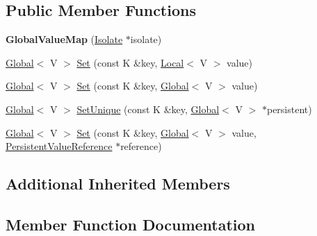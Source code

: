 \subsection*{Public Member Functions}
\begin{DoxyCompactItemize}
\item 
\mbox{\label{classv8_1_1GlobalValueMap_a60018c72fdae03d51b687d2a941140f4}} 
{\bfseries Global\+Value\+Map} (\mbox{\hyperlink{classv8_1_1Isolate}{Isolate}} $\ast$isolate)
\item 
\mbox{\hyperlink{classv8_1_1Global}{Global}}$<$ V $>$ \mbox{\hyperlink{classv8_1_1GlobalValueMap_aa13f7914642c705b8e96824747ea115a}{Set}} (const K \&key, \mbox{\hyperlink{classv8_1_1Local}{Local}}$<$ V $>$ value)
\item 
\mbox{\hyperlink{classv8_1_1Global}{Global}}$<$ V $>$ \mbox{\hyperlink{classv8_1_1GlobalValueMap_ac2b02a0105393e6e3ab7e0aeeed9a294}{Set}} (const K \&key, \mbox{\hyperlink{classv8_1_1Global}{Global}}$<$ V $>$ value)
\item 
\mbox{\hyperlink{classv8_1_1Global}{Global}}$<$ V $>$ \mbox{\hyperlink{classv8_1_1GlobalValueMap_aad73de3912571a2f245454d3edea4a41}{Set\+Unique}} (const K \&key, \mbox{\hyperlink{classv8_1_1Global}{Global}}$<$ V $>$ $\ast$persistent)
\item 
\mbox{\hyperlink{classv8_1_1Global}{Global}}$<$ V $>$ \mbox{\hyperlink{classv8_1_1GlobalValueMap_aaa5fa26f751c8608716ad5578cd6c1d0}{Set}} (const K \&key, \mbox{\hyperlink{classv8_1_1Global}{Global}}$<$ V $>$ value, \mbox{\hyperlink{classv8_1_1PersistentValueMapBase_1_1PersistentValueReference}{Persistent\+Value\+Reference}} $\ast$reference)
\end{DoxyCompactItemize}
\subsection*{Additional Inherited Members}


\subsection{Member Function Documentation}
\mbox{\label{classv8_1_1GlobalValueMap_aa13f7914642c705b8e96824747ea115a}} 
